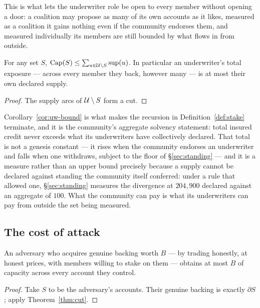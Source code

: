 This is what lets the underwriter role be open to every member without opening a door: a
coalition may propose as many of its own accounts as it likes, measured as a coalition it
gains nothing even if the community endorses them, and measured individually its members
are still bounded by what flows in from outside.

\begin{corollary}
\label{cor:uw-bound}
For any set $S$, $\mathrm{Cap}(S) \le \sum_{u\in\mathcal{U}\setminus S}\mathrm{sup}(u)$. In particular an
underwriter's total exposure --- across every member they back, however many --- is at
most their own declared supply.
\end{corollary}

\begin{proof}
The supply arcs of $\mathcal{U}\setminus S$ form a cut.
\end{proof}

Corollary~\ref{cor:uw-bound} is what makes the recursion in Definition~\ref{def:stake}
terminate, and it is the community's aggregate solvency statement: total insured credit
never exceeds what its underwriters have collectively declared. That total is not a
genesis constant --- it rises when the community endorses an underwriter and falls when
one withdraws, subject to the floor of \S\ref{sec:standing} --- and it is a measure rather
than an upper bound precisely because a supply cannot be declared against standing the
community itself conferred: under a rule that allowed one, \S\ref{sec:standing} measures
the divergence at $204{,}900$ declared against an aggregate of $100$. What the community
can pay is what its underwriters can pay from outside the set being measured.

\subsection{The cost of attack}

\begin{corollary}[Linearity]
\label{cor:linear}
An adversary who acquires genuine backing worth $B$ --- by trading honestly, at honest
prices, with members willing to stake on them --- obtains at most $B$ of capacity across
every account they control.
\end{corollary}

\begin{proof}
Take $S$ to be the adversary's accounts. Their genuine backing is exactly $\partial S$;
apply Theorem~\ref{thm:cut}.
\end{proof}

